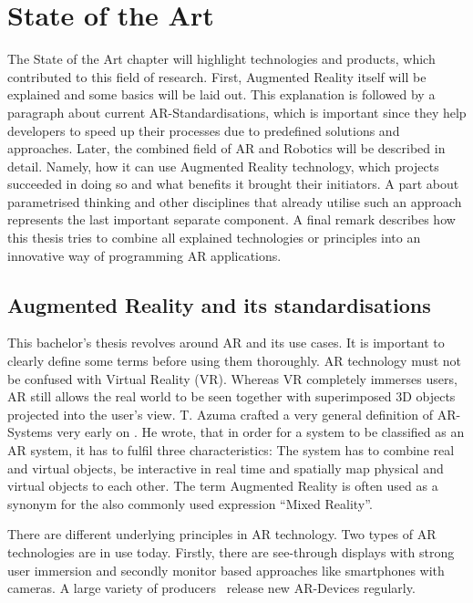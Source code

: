 \chapter{State of the Art}\label{Chap:StateOfTheArt}

The State of the Art chapter will highlight technologies and products, which contributed to this field of research. First, Augmented Reality itself will be explained and some basics will be laid out. This explanation is followed by a paragraph about current AR-Standardisations, which is important since they help developers to speed up their processes due to predefined solutions and approaches. Later, the combined field of AR and Robotics will be described in detail. Namely, how it can use Augmented Reality technology, which projects succeeded in doing so and what benefits it brought their initiators. A part about parametrised thinking and other disciplines that already utilise such an approach represents the last important separate component. A final remark describes how this thesis tries to combine all explained technologies or principles into an innovative way of programming AR applications.

\section{Augmented Reality and its standardisations}

This bachelor's thesis revolves around AR and its use cases. It is important to clearly define some terms before using them thoroughly. AR technology must not be confused with Virtual Reality (VR). Whereas VR completely immerses users, AR still allows the real world to be seen together with superimposed 3D objects projected into the user's view. T. Azuma crafted a very general definition of AR-Systems very early on \cite{azuma1997survey}. He wrote, that in order for a system to be classified as an AR system, it has to fulfil three characteristics: The system has to combine real and virtual objects, be interactive in real time and spatially map physical and virtual objects to each other. The term Augmented Reality is often used as a synonym for the also commonly used expression “Mixed Reality”. 

There are different underlying principles in AR technology. Two types of AR technologies are in use today. Firstly, there are see-through displays with strong user immersion and secondly monitor based approaches like smartphones with cameras. A large variety of producers~\cite{ARProudcersVariety} release new AR-Devices regularly.

